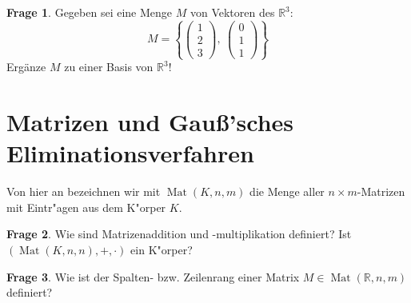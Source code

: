 \documentclass[11pt]{scrartcl}
\theoremstyle{definition}
\newtheorem{frage}{Frage}
\newcommand{\R}{\mathbb R}
\DeclareMathOperator{\Mat}{Mat}
\begin{document}
\begin{frage}
Gegeben sei eine Menge $M$ von Vektoren des $\R^3$:
\[
    M = \left\{ 
        \begin{pmatrix} 1 \\ 2 \\ 3 \end{pmatrix}, \:
        \begin{pmatrix} 0 \\ 1 \\ 1 \end{pmatrix}
    \right\}
\]
Ergänze $M$ zu einer Basis von $\R^3$!
\end{frage}

\section {Matrizen und Gauß'sches Eliminationsverfahren}

Von hier an bezeichnen wir mit $\Mat(K, n, m)$ die Menge aller
$n \times m$-Matrizen mit Eintr"agen aus dem K"orper $K$.

\begin{frage}
Wie sind Matrizenaddition und -multiplikation definiert? Ist
$(\Mat(K, n, n), +, \cdot)$ ein K"orper?
\end{frage}

\begin{frage}
Wie ist der Spalten- bzw. Zeilenrang einer Matrix $M \in \Mat(\R, n, m)$
definiert?
\end{frage}
\end{document}
